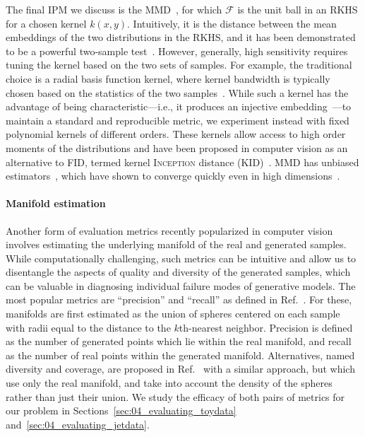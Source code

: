 The final IPM we discuss is the MMD~\cite{mmd}, for which $\mathcal F$ is the unit ball in an RKHS for a chosen kernel $k(x, y)$.
Intuitively, it is the distance between the mean embeddings of the two distributions in the RKHS, and it has been demonstrated to be a powerful two-sample test~\cite{gretton_mmd, liu_deepkernels}.
However, generally, high sensitivity requires tuning the kernel based on the two sets of samples.
For example, the traditional choice is a radial basis function kernel, where kernel bandwidth is typically chosen based on the statistics of the two samples~\cite{gretton_mmd}.
While such a kernel has the advantage of being characteristic---i.e., it produces an injective embedding~\cite{sriperumbudur_rkhs}---to maintain a standard and reproducible metric, we experiment instead with fixed polynomial kernels of different orders.
These kernels allow access to high order moments of the distributions and have been proposed in computer vision as an alternative to FID, termed kernel \textsc{Inception} distance (KID)~\cite{binkowski_demystifying}.
MMD has unbiased estimators~\cite{gretton_mmd}, which have shown to converge quickly even in high dimensions~\cite{binkowski_demystifying}.


\paragraph{Manifold estimation}

Another form of evaluation metrics recently popularized in computer vision involves estimating the underlying manifold of the real and generated samples.
While computationally challenging, such metrics can be intuitive and allow us to disentangle the aspects of quality and diversity of the generated samples, which can be valuable in diagnosing individual failure modes of generative models.
The most popular metrics are ``precision'' and ``recall'' as defined in Ref.~\cite{kynkaanniemi_pr}.
For these, manifolds are first estimated as the union of spheres centered on each sample with radii equal to the distance to the $k$th-nearest neighbor.
Precision is defined as the number of generated points which lie within the real manifold, and recall as the number of real points within the generated manifold.
Alternatives, named diversity and coverage, are proposed in Ref.~\cite{naeem_dc} with a similar approach, but which use only the real manifold, and take into account the density of the spheres rather than just their union.
We study the efficacy of both pairs of metrics for our problem in Sections~\ref{sec:04_evaluating_toydata} and~\ref{sec:04_evaluating_jetdata}.


